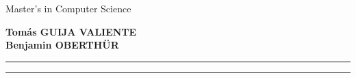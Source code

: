 \begin{titlepage}
\vspace{15mm}

Master's in Computer Science\\  %

\vspace{15mm}

\Large 
{\color{BleuFonce} \textbf{Tom\'as GUIJA VALIENTE}}\\
{\color{BleuFonce} \textbf{Benjamin OBERTHÜR}}

\vspace{20mm}

\centering

\hrule
\begin{abstract}
    \lipsum*[1]
\end{abstract}
\vspace*{3mm}
\hrule

\end{titlepage}